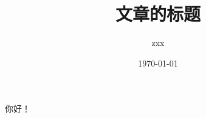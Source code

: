\documentclass[UTF8]{ctexart}
\title{文章的标题}
\author{zxx}
\date{\today}
\begin{document}
	\maketitle
	你好！
\end{document}
